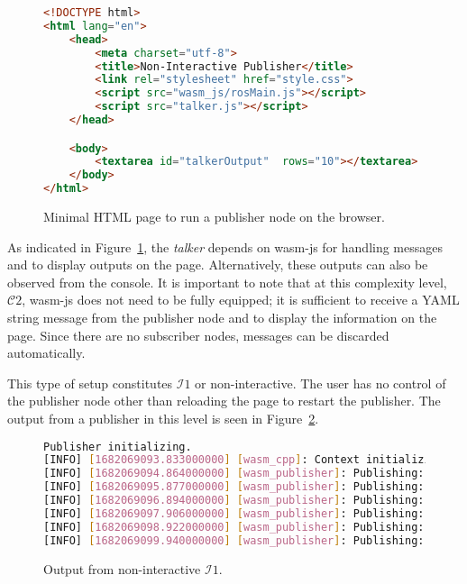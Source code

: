         \begin{figure}[htbp]
            \begin{lstlisting}[language=html]
<!DOCTYPE html>
<html lang="en">
    <head>
        <meta charset="utf-8">
        <title>Non-Interactive Publisher</title>
        <link rel="stylesheet" href="style.css">
        <script src="wasm_js/rosMain.js"></script>
        <script src="talker.js"></script>
    </head>

    <body>
        <textarea id="talkerOutput"  rows="10"></textarea>
    </body>
</html>
\end{lstlisting}
            \caption{Minimal \ac{HTML} page to run a publisher node on the browser.}
            \label{fig:html}
        \end{figure}

        As indicated in Figure~\ref{fig:html}, the \textit{talker} depends on \textsf{wasm-js} for handling messages and to display outputs on the page. Alternatively, these outputs can also be observed from the console. It is important to note that at this complexity level, $\mathcal{C}2$, \textsf{wasm-js} does not need to be fully equipped; it is sufficient to receive a \ac{YAML} string message from the publisher node and to display the information on the page. Since there are no subscriber nodes, messages can be discarded automatically.
        
        This type of setup constitutes $\mathcal{I}1$ or non-interactive. The user has no control of the publisher node other than reloading the page to restart the publisher. The output from a publisher in this level is seen in Figure~\ref{fig:ui1}. 

        \begin{figure}[htbp]
            \centering

            \begin{lstlisting}[language=Bash]
Publisher initializing.
[INFO] [1682069093.833000000] [wasm_cpp]: Context initializing.
[INFO] [1682069094.864000000] [wasm_publisher]: Publishing: 'Hello there! 0'
[INFO] [1682069095.877000000] [wasm_publisher]: Publishing: 'Hello there! 1'
[INFO] [1682069096.894000000] [wasm_publisher]: Publishing: 'Hello there! 2'
[INFO] [1682069097.906000000] [wasm_publisher]: Publishing: 'Hello there! 3'
[INFO] [1682069098.922000000] [wasm_publisher]: Publishing: 'Hello there! 4'
[INFO] [1682069099.940000000] [wasm_publisher]: Publishing: 'Hello there! 5'
\end{lstlisting}
            \caption{Output from non-interactive $\mathcal{I}1$.}\label{fig:ui1}
        \end{figure}

